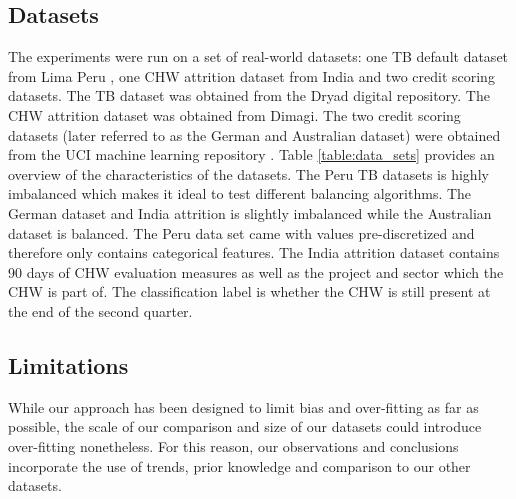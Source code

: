 \documentclass{sig-alternate-05-2015}
\begin{document}
	\subsection{Datasets}
	The experiments were run on a set of real-world datasets: one TB default dataset from Lima Peru \cite{Lackey:10356751520150601}, one CHW attrition dataset from India and two credit scoring datasets. The TB dataset was obtained from the Dryad digital repository. The CHW attrition dataset was obtained from Dimagi. The two credit scoring datasets (later referred to as the German and Australian dataset) were obtained from the UCI machine learning repository \cite{Lichman:2013}. Table \ref{table:data_sets} provides an overview of the characteristics of the datasets. The Peru TB datasets is highly imbalanced which makes it ideal to test different balancing algorithms. The German dataset and India attrition is slightly imbalanced while the Australian dataset is balanced. The Peru data set came with values pre-discretized and therefore only contains categorical features. The India attrition dataset contains 90 days of CHW evaluation measures as well as the project and sector which the CHW is part of. The classification label is whether the CHW is still present at the end of the second quarter.
	\begin{table}
		\centering
		\small
		\caption{Data set summary}
		\label{table:data_sets}
	\end{table}

	\subsection{Limitations}
	While our approach has been designed to limit bias and over-fitting as far as possible, the scale of our comparison and size of our datasets could introduce over-fitting nonetheless. For this reason, our observations and conclusions incorporate the use of trends, prior knowledge and comparison to our other datasets. 
	
\end{document}
